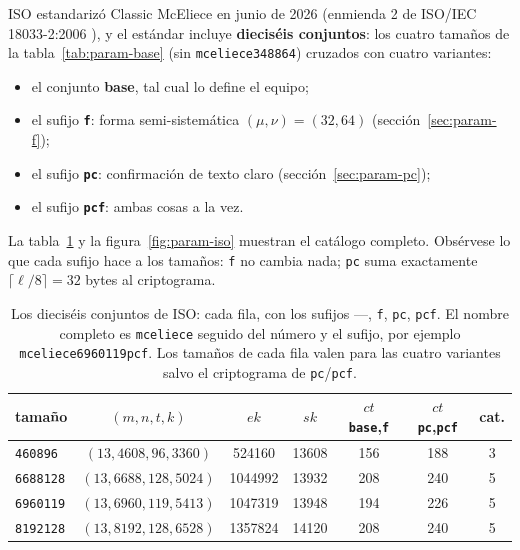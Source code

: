 \documentclass[11pt,a4paper,oneside]{report}
\begin{document}
ISO estandarizó Classic McEliece en junio de 2026 (enmienda 2 de
ISO/IEC 18033-2:2006 \cite{iso18033}), y el estándar incluye
\textbf{dieciséis conjuntos}: los cuatro tamaños de la
tabla~\ref{tab:param-base} (sin \texttt{mceliece348864}) cruzados con
cuatro variantes:

\begin{itemize}[leftmargin=1.5em,itemsep=2pt]
  \item el conjunto \textbf{base}, tal cual lo define el equipo;
  \item el sufijo \textbf{\texttt{f}}: forma semi-sistemática
        $(\mu,\nu)=(32{,}64)$ (sección~\ref{sec:param-f});
  \item el sufijo \textbf{\texttt{pc}}: confirmación de texto claro
        (sección~\ref{sec:param-pc});
  \item el sufijo \textbf{\texttt{pcf}}: ambas cosas a la vez.
\end{itemize}

La tabla~\ref{tab:param-iso} y la figura~\ref{fig:param-iso} muestran
el catálogo completo. Obsérvese lo que cada sufijo hace a los tamaños:
\texttt{f} no cambia nada; \texttt{pc} suma exactamente
$\lceil\ell/8\rceil=32$ bytes al criptograma.

\begin{table}[htbp]
\centering
\small
\setlength{\tabcolsep}{6pt}
\begin{tabular}{lcccccc}
\toprule
tamaño & $(m,n,t,k)$ & $ek$ & $sk$ & $ct$ \texttt{base},\texttt{f} & $ct$ \texttt{pc},\texttt{pcf} & cat.\\
\midrule
\texttt{460896}  & $(13,4608,96,3360)$  & \num{524160}  & \num{13608} & 156 & 188 & 3\\
\texttt{6688128} & $(13,6688,128,5024)$ & \num{1044992} & \num{13932} & 208 & 240 & 5\\
\texttt{6960119} & $(13,6960,119,5413)$ & \num{1047319} & \num{13948} & 194 & 226 & 5\\
\texttt{8192128} & $(13,8192,128,6528)$ & \num{1357824} & \num{14120} & 208 & 240 & 5\\
\bottomrule
\end{tabular}
\caption[Los dieciséis conjuntos de ISO, cada fila con sus cuatro variantes.]{Los dieciséis conjuntos de ISO: cada fila, con los sufijos
---, \texttt{f}, \texttt{pc}, \texttt{pcf}. El nombre completo es
\texttt{mceliece} seguido del número y el sufijo, por ejemplo
\texttt{mceliece6960119pcf}. Los tamaños de cada fila valen para las
cuatro variantes salvo el criptograma de \texttt{pc}/\texttt{pcf}.}
\label{tab:param-iso}
\end{table}
\end{document}
